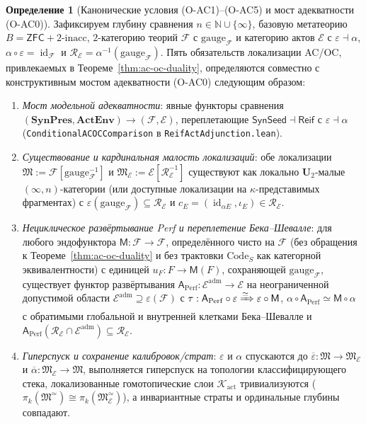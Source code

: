 \documentclass[11pt]{article}
\theoremstyle{plain}
\theoremstyle{definition}
\newtheorem{definition}[theorem]{Определение}
\newcommand{\cF}{\mathcal{F}}
\newcommand{\fM}{\mathfrak{M}}
\newcommand{\ZFC}{\mathsf{ZFC}}
\newcommand{\cE}{\mathcal{E}}
\DeclareMathOperator{\id}{id}
\begin{document}
\begin{definition}[Канонические условия \textup{(O-AC1)--(O-AC5)} и мост адекватности \textup{(O-AC0)}]\label{def:o-ac-conditions}
Зафиксируем глубину сравнения $n \in \mathbb{N} \cup \{\infty\}$, базовую метатеорию $B = \ZFC + 2\text{-}\mathrm{inacc}$, $2$-категорию теорий $\cF$ с $\mathrm{gauge}_\cF$ и категорию актов $\cE$ с $\varepsilon \dashv \alpha$, $\alpha \circ \varepsilon = \id_\cF$ и $\mathcal{R}_\cE = \alpha^{-1}(\mathrm{gauge}_\cF)$. Пять обязательств локализации AC/OC, привлекаемых в Теореме~\ref{thm:ac-oc-duality}, определяются совместно с конструктивным мостом адекватности \textup{(O-AC0)} следующим образом:
\begin{enumerate}[nosep,label=\textup{(O-AC\arabic*)},start=0]
\item \emph{Мост модельной адекватности}: явные функторы сравнения $(\mathbf{SynPres}, \mathbf{ActEnv}) \to (\cF, \cE)$, переплетающие $\mathsf{SynSeed} \dashv \mathsf{Reif}$ с $\varepsilon \dashv \alpha$ (\texttt{ConditionalACOCComparison} в \texttt{ReifActAdjunction.lean}).
\item \emph{Существование и кардинальная малость локализаций}: обе локализации $\fM := \cF[\mathrm{gauge}_\cF^{-1}]$ и $\fM_\cE := \cE[\mathcal{R}_\cE^{-1}]$ существуют как локально $\mathbf{U}_2$-малые $(\infty, n)$-категории (или доступные локализации на $\kappa$-представимых фрагментах) с $\varepsilon(\mathrm{gauge}_\cF) \subseteq \mathcal{R}_\cE$ и $c_E = (\id_{\alpha E}, \iota_E) \in \mathcal{R}_\cE$.
\item \emph{Нециклическое развёртывание \textup{Perf} и переплетение Бека--Шевалле}: для любого эндофунктора $\mathsf{M} : \cF \to \cF$, определённого чисто на $\cF$ (без обращения к Теореме~\ref{thm:ac-oc-duality} и без трактовки $\mathrm{Code}_S$ как категорной эквивалентности) с единицей $u_F : F \to \mathsf{M}(F)$, сохраняющей $\mathrm{gauge}_\cF$, существует функтор развёртывания $\mathsf{A}_{\mathrm{Perf}} : \cE^{\mathrm{adm}} \to \cE$ на неограниченной допустимой области $\cE^{\mathrm{adm}} \supseteq \varepsilon(\cF)$ с $\tau : \mathsf{A}_{\mathrm{Perf}} \circ \varepsilon \xRightarrow{\simeq} \varepsilon \circ \mathsf{M}$, $\alpha \circ \mathsf{A}_{\mathrm{Perf}} \simeq \mathsf{M} \circ \alpha$ с обратимыми глобальной и внутренней клетками Бека--Шевалле и $\mathsf{A}_{\mathrm{Perf}}(\mathcal{R}_\cE \cap \cE^{\mathrm{adm}}) \subseteq \mathcal{R}_\cE$.
\item \emph{Гиперспуск и сохранение калибровок/страт}: $\varepsilon$ и $\alpha$ спускаются до $\overline{\varepsilon} : \fM \to \fM_\cE$ и $\overline{\alpha} : \fM_\cE \to \fM$, выполняется гиперспуск на топологии классифицирующего стека, локализованные гомотопические слои $\mathcal{K}_{\mathrm{act}}$ тривиализуются ($\pi_k(\fM^\simeq) \cong \pi_k(\fM_\cE^\simeq)$), а инвариантные страты и ординальные глубины совпадают.

\end{enumerate}
\end{definition}
\end{document}
